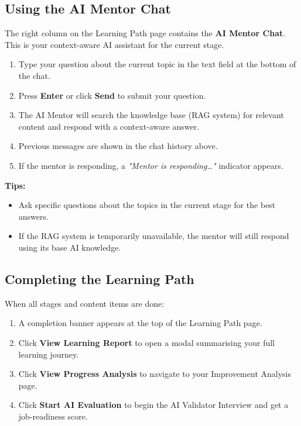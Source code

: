 \documentclass{FastFyp}
\begin{document}
\subsection{Using the AI Mentor Chat}
The right column on the Learning Path page contains the \textbf{AI Mentor Chat}. This is your context-aware AI assistant for the current stage.

\begin{enumerate}
    \item Type your question about the current topic in the text field at the bottom of the chat.
    \item Press \textbf{Enter} or click \textbf{Send} to submit your question.
    \item The AI Mentor will search the knowledge base (RAG system) for relevant content and respond with a context-aware answer.
    \item Previous messages are shown in the chat history above.
    \item If the mentor is responding, a \textit{"Mentor is responding\ldots"} indicator appears.
\end{enumerate}

\noindent\textbf{Tips:}
\begin{itemize}
    \item Ask specific questions about the topics in the current stage for the best answers.
    \item If the RAG system is temporarily unavailable, the mentor will still respond using its base AI knowledge.
\end{itemize}

\subsection{Completing the Learning Path}

When all stages and content items are done:
\begin{enumerate}
    \item A completion banner appears at the top of the Learning Path page.
    \item Click \textbf{View Learning Report} to open a modal summarising your full learning journey.
    \item Click \textbf{View Progress Analysis} to navigate to your Improvement Analysis page.
    \item Click \textbf{Start AI Evaluation} to begin the AI Validator Interview and get a job-readiness score.
\end{enumerate}
\end{document}
